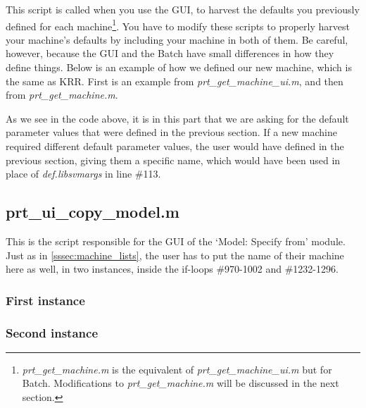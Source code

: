 This script is called when you use the GUI, to harvest the defaults you previously defined for each machine\footnote{\textit{prt\_get\_machine.m} is the equivalent of \textit{prt\_get\_machine\_ui.m} but for Batch. Modifications to \textit{prt\_get\_machine.m} will be discussed in the next section.}. You have to modify these scripts to properly harvest your machine’s defaults by including your machine in both of them. Be careful, however, because the GUI and the Batch have small differences in how they define things. Below is an example of how we defined our new machine, which is the same as KRR. First is an example from \textit{prt\_get\_machine\_ui.m}, and then from \textit{prt\_get\_machine.m}.



As we see in the code above, it is in this part that we are asking for the default parameter values that were defined in the previous section. If a new machine required different default parameter values, the user would have defined in the previous section, giving them a specific name, which would have been used in place of \textit{def.libsvmargs} in line \#113.


\subsection{prt\_ui\_copy\_model.m}

This is the script responsible for the GUI of the `Model: Specify from' module. Just as in \ref{sssec:machine_lists}, the user has to put the name of their machine here as well, in two instances, inside the if-loops \#970-1002 and \#1232-1296.

\subsubsection{First instance}



\subsubsection{Second instance}





